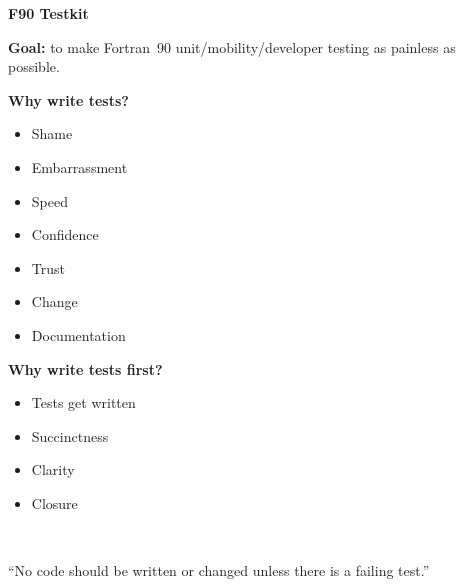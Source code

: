 \documentclass[landscape]{slides}
\begin{document}
\begin{slide}
 \begin{center}
  {\bf\Large F90 Testkit}\\
  \vspace{0.5in}
  \begin{minipage}{6.5in}
    {\bf Goal:} to make Fortran~90 unit/\-mobility/\-developer testing
    as painless as possible.
  \end{minipage}
 \end{center}
\end{slide}
\begin{slide}
  \begin{center}
    {\bf\Large Why write tests?}\\
    \vspace{0.5in}
    \begin{minipage}[t]{3in}
     \begin{itemize}
      \item Shame
      \item Embarrassment
      \item Speed
      \item Confidence
     \end{itemize}
    \end{minipage}
    \begin{minipage}[t]{3in}
     \begin{itemize}
      \item Trust
      \item Change
      \item Documentation
     \end{itemize}
    \end{minipage}
  \end{center}
\end{slide}
\begin{slide}
  \begin{center}
    {\bf\Large Why write tests first?}\\
    \vspace{0.5in}
    \begin{minipage}{3in}
    \begin{itemize}
     \item Tests get written
     \item Succinctness
     \item Clarity
     \item Closure
    \end{itemize}
    \end{minipage}\\
    \vspace{1in}
    \begin{minipage}{5.7in}\raggedright
      ``No code should be written or changed unless there is a failing
      test.''
    \end{minipage}
  \end{center}
\end{slide}
\end{document}

